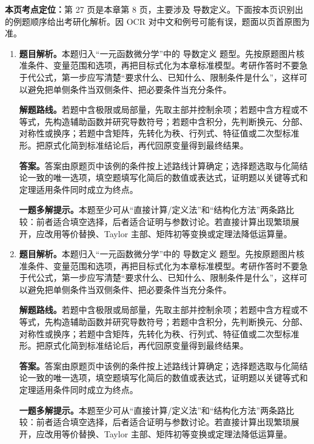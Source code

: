 \begin{solutionblock}
\textbf{本页考点定位：}第 27 页是本章第 8 页，主要涉及 导数定义。下面按本页识别出的例题顺序给出考研化解析。因 OCR 对中文和例号可能有误，题面以页首原图为准。

\begin{enumerate}[label=\textbf{例\arabic*.}, leftmargin=2.4em]

\item \textbf{题目解析。}本题归入“一元函数微分学”中的 导数定义 题型。先按原题图片核准条件、变量范围和选项，再把目标式化为本章标准模型。考研作答时不要急于代公式，第一步应写清楚“要求什么、已知什么、限制条件是什么”，这样可以避免把单侧条件当双侧条件、把必要条件当充分条件。

\textbf{解题路线。}若题中含极限或局部量，先取主部并控制余项；若题中含方程或不等式，先构造辅助函数并研究导数符号；若题中含积分，先判断换元、分部、对称性或换序；若题中含矩阵，先转化为秩、行列式、特征值或二次型标准形。把原式化简到标准结论后，再代回原变量得到最终结果。

\textbf{答案。}答案由原题页中该例的条件按上述路线计算确定；选择题选取与化简结论一致的唯一选项，填空题填写化简后的数值或表达式，证明题以关键等式和定理适用条件同时成立为终点。

\textbf{一题多解提示。}本题至少可从“直接计算/定义法”和“结构化方法”两条路比较：前者适合填空选择，后者适合证明与参数讨论。若直接计算出现繁琐展开，应改用等价替换、Taylor 主部、矩阵初等变换或定理法降低运算量。

\item \textbf{题目解析。}本题归入“一元函数微分学”中的 导数定义 题型。先按原题图片核准条件、变量范围和选项，再把目标式化为本章标准模型。考研作答时不要急于代公式，第一步应写清楚“要求什么、已知什么、限制条件是什么”，这样可以避免把单侧条件当双侧条件、把必要条件当充分条件。

\textbf{解题路线。}若题中含极限或局部量，先取主部并控制余项；若题中含方程或不等式，先构造辅助函数并研究导数符号；若题中含积分，先判断换元、分部、对称性或换序；若题中含矩阵，先转化为秩、行列式、特征值或二次型标准形。把原式化简到标准结论后，再代回原变量得到最终结果。

\textbf{答案。}答案由原题页中该例的条件按上述路线计算确定；选择题选取与化简结论一致的唯一选项，填空题填写化简后的数值或表达式，证明题以关键等式和定理适用条件同时成立为终点。

\textbf{一题多解提示。}本题至少可从“直接计算/定义法”和“结构化方法”两条路比较：前者适合填空选择，后者适合证明与参数讨论。若直接计算出现繁琐展开，应改用等价替换、Taylor 主部、矩阵初等变换或定理法降低运算量。


\end{enumerate}
\end{solutionblock}
